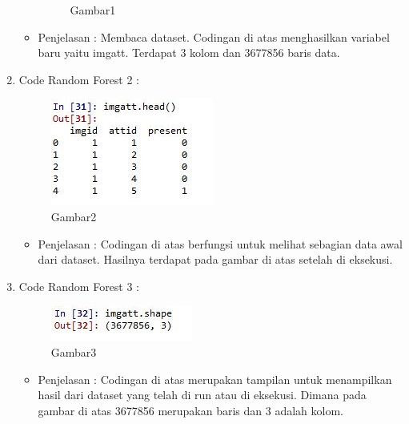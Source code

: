 \begin{enumerate}
\begin{itemize}
\begin{figure}[ht]
\caption{Gambar1}
\label{contoh}
\end{figure}
\par
\end{itemize}

\begin{itemize}
\item Penjelasan : Membaca dataset. Codingan di atas menghasilkan variabel baru yaitu imgatt. Terdapat 3 kolom dan 3677856 baris data.
\par 
\par
\end{itemize}
\item Code Random Forest 2 :
\par
\begin{figure}[ht]
\centering
\includegraphics[scale=0.7]{figures/AFS/4b.jpg}
\caption{Gambar2}
\label{contoh}
\end{figure}
\par
\begin{itemize}
\item Penjelasan : Codingan di atas berfungsi untuk melihat sebagian data awal dari dataset. Hasilnya terdapat pada gambar di atas setelah di eksekusi.
\par
\par
\end{itemize}
\item Code Random Forest 3 :
\par
\begin{figure}[ht]
\centering
\includegraphics[scale=0.7]{figures/AFS/4c.jpg}
\caption{Gambar3}
\label{contoh}
\end{figure}
\par
\begin{itemize}
\item Penjelasan : Codingan di atas merupakan tampilan untuk menampilkan hasil dari dataset yang telah di run atau di eksekusi. Dimana pada gambar di atas 3677856 merupakan baris dan 3 adalah kolom.
\par

\end{itemize}
\end{enumerate}
